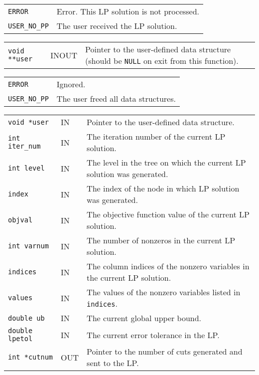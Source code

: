 \documentclass[twoside,11pt]{article}
\begin{document}
{\newpage
\clearpage
\samepage \begin{tabular}{lp{365.945pt}}
{\tt ERROR} & Error. This LP solution is not processed. \\ 
{\tt USER\_NO\_PP} & The user received the LP solution. \\ 
\end{tabular}
}

{\newpage
\clearpage
\samepage \begin{tabular}{llp{317.395pt}}
{\tt void **user} & INOUT & Pointer to the user-defined data structure
(should be {\tt NULL} on exit from this function). \\ 
\end{tabular}
}

{\newpage
\clearpage
\samepage \begin{tabular}{lp{365.945pt}}
{\tt ERROR} & Ignored. \\ 
{\tt USER\_NO\_PP} & The user freed all data structures. \\ 
\end{tabular}
}

{\newpage
\clearpage
\samepage \begin{tabular}{llp{306.895pt}}
{\tt void *user} & IN & Pointer to the user-defined data structure.
\\ 
{\tt int iter\_num} & IN & The iteration number of the current LP solution. \\ 
{\tt int level} & IN & The level in the tree on which the current LP
solution was generated. \\ 
{\tt index} & IN & The index of the node in which LP solution was generated.
\\ 
{\tt objval} & IN & The objective function value of the current LP solution.
\\ 
{\tt int varnum} & IN & The number of nonzeros in the current LP solution. \\ 
{\tt indices} & IN & The column indices of the nonzero variables in the current
LP solution. \\ 
{\tt values} & IN & The values of the nonzero variables listed in 
{\tt indices}.
\\ 
{\tt double ub} & IN & The current global upper bound. \\ 
{\tt double lpetol} & IN & The current error tolerance in the LP. \\ 
{\tt int *cutnum} & OUT & Pointer to the number of cuts generated
and sent to the LP. \\ 
\end{tabular}
}
\end{document}
